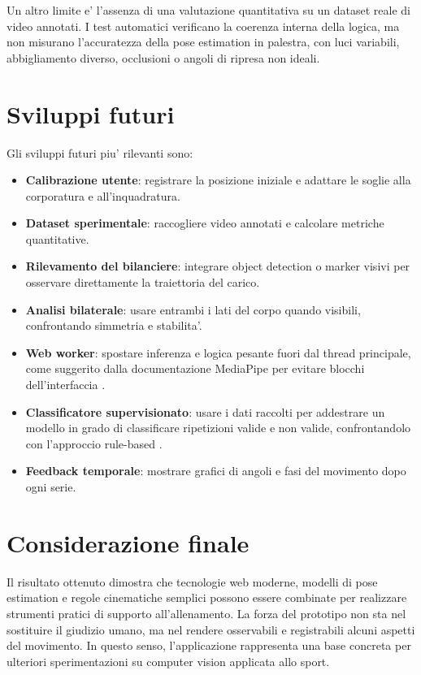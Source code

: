 Un altro limite e' l'assenza di una valutazione quantitativa su un dataset reale di video annotati. I test automatici verificano la coerenza interna della logica, ma non misurano l'accuratezza della pose estimation in palestra, con luci variabili, abbigliamento diverso, occlusioni o angoli di ripresa non ideali.

\section{Sviluppi futuri}

Gli sviluppi futuri piu' rilevanti sono:

\begin{itemize}
  \item \textbf{Calibrazione utente}: registrare la posizione iniziale e adattare le soglie alla corporatura e all'inquadratura.
  \item \textbf{Dataset sperimentale}: raccogliere video annotati e calcolare metriche quantitative.
  \item \textbf{Rilevamento del bilanciere}: integrare object detection o marker visivi per osservare direttamente la traiettoria del carico.
  \item \textbf{Analisi bilaterale}: usare entrambi i lati del corpo quando visibili, confrontando simmetria e stabilita'.
  \item \textbf{Web worker}: spostare inferenza e logica pesante fuori dal thread principale, come suggerito dalla documentazione MediaPipe per evitare blocchi dell'interfaccia \cite{mediapipePoseWeb2026}.
  \item \textbf{Classificatore supervisionato}: usare i dati raccolti per addestrare un modello in grado di classificare ripetizioni valide e non valide, confrontandolo con l'approccio rule-based \cite{geron2019hands,goodfellow2016deep}.
  \item \textbf{Feedback temporale}: mostrare grafici di angoli e fasi del movimento dopo ogni serie.
\end{itemize}

\section{Considerazione finale}

Il risultato ottenuto dimostra che tecnologie web moderne, modelli di pose estimation e regole cinematiche semplici possono essere combinate per realizzare strumenti pratici di supporto all'allenamento. La forza del prototipo non sta nel sostituire il giudizio umano, ma nel rendere osservabili e registrabili alcuni aspetti del movimento. In questo senso, l'applicazione rappresenta una base concreta per ulteriori sperimentazioni su computer vision applicata allo sport.
